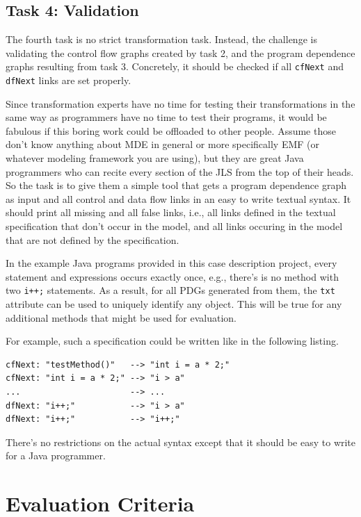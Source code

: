 \documentclass[10pt]{article}
\begin{document}
\subsection{Task 4: Validation}
\label{sec:task4-validation}

The fourth task is no strict transformation task.  Instead, the challenge is
validating the control flow graphs created by task 2, and the program
dependence graphs resulting from task 3.  Concretely, it should be checked if
all \verb|cfNext| and \verb|dfNext| links are set properly.

Since transformation experts have no time for testing their transformations in
the same way as programmers have no time to test their programs, it would be
fabulous if this boring work could be offloaded to other people.  Assume those
don't know anything about MDE in general or more specifically EMF (or whatever
modeling framework you are using), but they are great Java programmers who can
recite every section of the JLS \cite{Java7Spec} from the top of their heads.
So the task is to give them a simple tool that gets a program dependence graph
as input and all control and data flow links in an easy to write textual
syntax.  It should print all missing and all false links, i.e., all links
defined in the textual specification that don't occur in the model, and all
links occuring in the model that are not defined by the specification.

In the example Java programs provided in this case description project, every
statement and expressions occurs exactly once, e.g., there's is no method with
two \verb|i++;| statements.  As a result, for all PDGs generated from them, the
\verb|txt| attribute can be used to uniquely identify any object.  This will be
true for any additional methods that might be used for evaluation.

For example, such a specification could be written like in the following
listing.

\begin{verbatim}
cfNext: "testMethod()"   --> "int i = a * 2;"
cfNext: "int i = a * 2;" --> "i > a"
...                      --> ...
dfNext: "i++;"           --> "i > a"
dfNext: "i++;"           --> "i++;"
\end{verbatim}

There's no restrictions on the actual syntax except that it should be easy to
write for a Java programmer.


\section{Evaluation Criteria}
\label{sec:evaluation-criteria}
\end{document}
